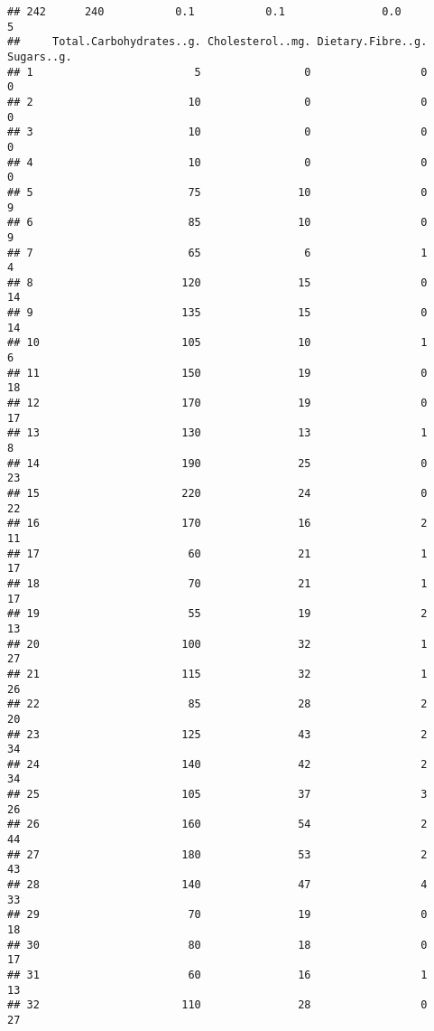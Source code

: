 \documentclass[
]{article}
\begin{document}
\begin{verbatim}
## 242      240           0.1           0.1               0.0           5
##     Total.Carbohydrates..g. Cholesterol..mg. Dietary.Fibre..g. Sugars..g.
## 1                         5                0                 0          0
## 2                        10                0                 0          0
## 3                        10                0                 0          0
## 4                        10                0                 0          0
## 5                        75               10                 0          9
## 6                        85               10                 0          9
## 7                        65                6                 1          4
## 8                       120               15                 0         14
## 9                       135               15                 0         14
## 10                      105               10                 1          6
## 11                      150               19                 0         18
## 12                      170               19                 0         17
## 13                      130               13                 1          8
## 14                      190               25                 0         23
## 15                      220               24                 0         22
## 16                      170               16                 2         11
## 17                       60               21                 1         17
## 18                       70               21                 1         17
## 19                       55               19                 2         13
## 20                      100               32                 1         27
## 21                      115               32                 1         26
## 22                       85               28                 2         20
## 23                      125               43                 2         34
## 24                      140               42                 2         34
## 25                      105               37                 3         26
## 26                      160               54                 2         44
## 27                      180               53                 2         43
## 28                      140               47                 4         33
## 29                       70               19                 0         18
## 30                       80               18                 0         17
## 31                       60               16                 1         13
## 32                      110               28                 0         27

\end{verbatim}
\end{document}
